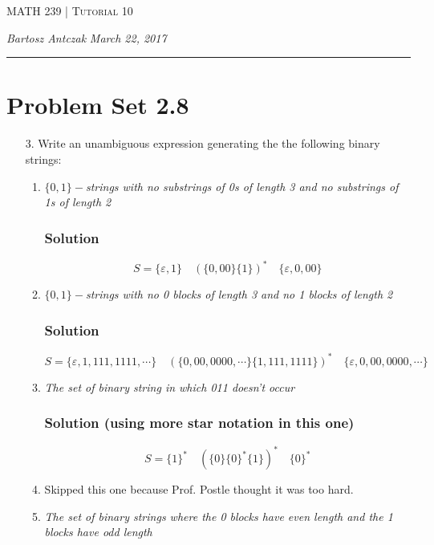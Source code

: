 \documentclass{report}
\newcommand{\lectureNum}{10}
\newcommand{\curDate}{March 22, 2017}
\newcommand{\course}{MATH 239}
\begin{document}
\begin{center}
\begin{Large}
\textsc{\course{} | Tutorial \lectureNum{}}
\end{Large}
\end{center} 
\noindent \textit{Bartosz Antczak} \hfill
\textit{\curDate{}}
\rule{\textwidth}{0.4pt}
\section*{Problem Set 2.8}
\begin{enumerate}
\item[3.] Write an unambiguous expression generating the the following binary strings:
\begin{enumerate}
\item \textit{$\{0,1\}-$strings with no substrings of 0s of length 3 and no substrings of 1s of length 2}
\subsubsection{Solution}
$$S = \{\varepsilon, 1\}\quad(\{0,00\}\{1\})^*\quad\{\varepsilon, 0, 00\}$$
\item \textit{$\{0,1\}-$strings with no 0 blocks of length 3 and no 1 blocks of length 2}
\subsubsection{Solution}
$$S = \{\varepsilon, 1, 111, 1111, \cdots\}\quad(\{0, 00, 0000, \cdots\}\{1, 111, 1111\})^*\quad\{\varepsilon, 0, 00, 0000, \cdots\}$$
\item \textit{The set of binary string in which 011 doesn't occur}
\subsubsection{Solution (using more star notation in this one)}
$$S = \{1\}^* \quad (\{0\}\{0\}^*\{1\})^*\quad \{0\}^*$$
\item Skipped this one because Prof. Postle thought it was too hard.
\item \textit{The set of binary strings where the 0 blocks have even length and the 1 blocks have odd length}

\end{enumerate}
\end{enumerate}
\end{document}
